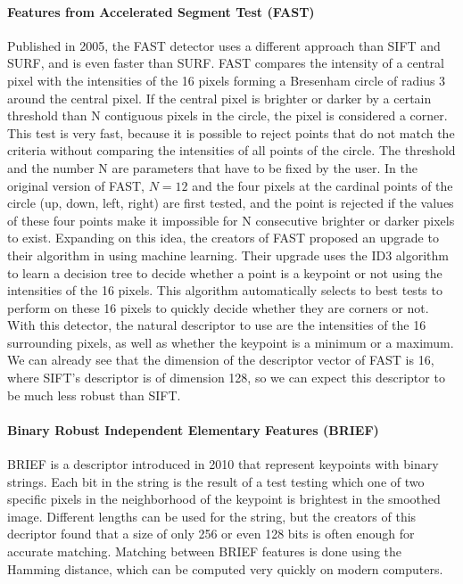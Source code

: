\paragraph{Features from Accelerated Segment Test (FAST)}
Published in 2005, the FAST detector \cite{fast} uses a different approach than SIFT and SURF, and is even faster than SURF. FAST compares the intensity of a central pixel with the intensities of the 16 pixels forming a Bresenham circle of radius 3 around the central pixel. If the central pixel is brighter or darker by a certain threshold than N contiguous pixels in the circle, the pixel is considered a corner. This test is very fast, because it is possible to reject points that do not match the criteria without comparing the intensities of all points of the circle. The threshold and the number N are parameters that have to be fixed by the user. In the original version of FAST, $N = 12$ and the four pixels at the cardinal points of the circle (up, down, left, right) are first tested, and the point is rejected if the values of these four points make it impossible for N consecutive brighter or darker pixels to exist.
Expanding on this idea, the creators of FAST proposed an upgrade to their algorithm in \cite{fast2} using machine learning. Their upgrade uses the ID3 algorithm to learn a decision tree to decide whether a point is a keypoint or not using the intensities of the 16 pixels. This algorithm automatically selects to best tests to perform on these 16 pixels to quickly decide whether they are corners or not.
With this detector, the natural descriptor to use are the intensities of the 16 surrounding pixels, as well as whether the keypoint is a minimum or a maximum. We can already see that the dimension of the descriptor vector of FAST is 16, where SIFT's descriptor is of dimension 128, so we can expect this descriptor to be much less robust than SIFT.

\paragraph{Binary Robust Independent Elementary Features (BRIEF)}
BRIEF \cite{brief} is a descriptor introduced in 2010 that represent keypoints with binary strings. Each bit in the string is the result of a test testing which one of two specific pixels in the neighborhood of the keypoint is brightest in the smoothed image. Different lengths can be used for the string, but the creators of this decriptor found that a size of only 256 or even 128 bits is often enough for accurate matching. Matching between BRIEF features is done using the Hamming distance, which can be computed very quickly on modern computers.

